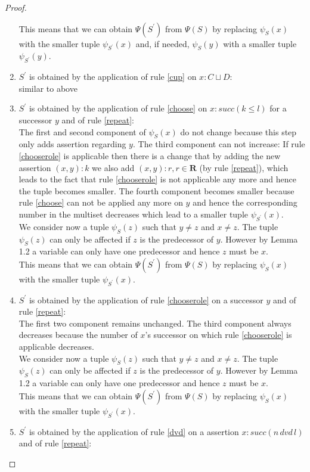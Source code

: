 \documentclass[a4paper,11pt]{scrartcl}
\theoremstyle{break}
\theoremstyle{definition}
\begin{document}
\begin{proof}
\begin{enumerate}
This means that we can obtain $\Psi(S^\prime)$ from $\Psi(S)$ by replacing $\psi_S(x)$ with the smaller tuple $\psi_{S^\prime}(x)$ and, if needed, $\psi_S(y)$ with a smaller tuple $\psi_{S^\prime}(y)$. 
\item $S^\prime$ is obtained by the application of rule \ref{cup} on $x:C\sqcup D$:\\
similar to above
\item $S^\prime$ is obtained by the application of rule \ref{choose} on $x:succ(k\leq l)$ for a successor $y$ and of rule \ref{repeat}:\\
The first and second component of $\psi_S(x)$ do not change because this step only adds assertion regarding $y$. The third component can not increase: If rule \ref{chooserole} is applicable then there is a change that by adding the new assertion $(x,y):k$ we also add $(x,y):r,r\in\mathbf{R}$ (by rule \ref{repeat}), which leads to the fact that rule \ref{chooserole} is not applicable any more and hence the tuple becomes smaller. The fourth component becomes smaller because rule \ref{choose} can not be applied any more on $y$ and hence the corresponding number in the multiset decreases which lead to a smaller tuple $\psi_{S^\prime}(x)$.\\
We consider now a tuple $\psi_S(z)$ such that $y\neq z$ and $x\neq z$. The tuple $\psi_S(z)$ can only be affected if $z$ is the predecessor of $y$. However by Lemma 1.2 a variable can only have one predecessor and hence $z$ must be $x$.\\
This means that we can obtain $\Psi(S^\prime)$ from $\Psi(S)$ by replacing $\psi_S(x)$ with the smaller tuple $\psi_{S^\prime}(x)$. 
\item $S^\prime$ is obtained by the application of rule \ref{chooserole} on a successor $y$ and of rule \ref{repeat}:\\
The first two component remains unchanged. The third component always decreases because the number of $x$'s successor on which rule \ref{chooserole} is applicable decreases.\\
We consider now a tuple $\psi_S(z)$ such that $y\neq z$ and $x\neq z$. The tuple $\psi_S(z)$ can only be affected if $z$ is the predecessor of $y$. However by Lemma 1.2 a variable can only have one predecessor and hence $z$ must be $x$.\\
This means that we can obtain $\Psi(S^\prime)$ from $\Psi(S)$ by replacing $\psi_S(x)$ with the smaller tuple $\psi_{S^\prime}(x)$. 
\item $S^\prime$ is obtained by the application of rule \ref{dvd} on a assertion $x:succ(n\,dvd\,l)$ and of rule \ref{repeat}:\\

\end{enumerate}
\end{proof}
\end{document}
